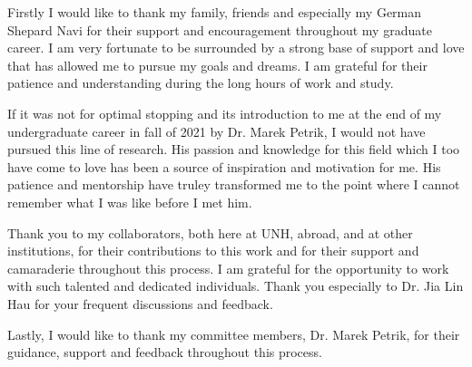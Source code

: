 
Firstly I would like to thank my family, friends and especially my German Shepard Navi for their support and encouragement throughout my graduate career. I am very fortunate to be surrounded by a strong base of support and love that has allowed me to pursue my goals and dreams. I am grateful for their patience and understanding during the long hours of work and study.

If it was not for optimal stopping and its introduction to me at the end of my undergraduate career in fall of 2021 by Dr. Marek Petrik, I would not have pursued this line of research. His passion and knowledge for this field which I too have come to love has been a source of inspiration and motivation for me. His patience and mentorship have truley transformed me to the point where I cannot remember what I was like before I met him.

Thank you to my collaborators, both here at UNH, abroad, and at other institutions, for their contributions to this work and for their support and camaraderie throughout this process. I am grateful for the opportunity to work with such talented and dedicated individuals. Thank you especially to Dr. Jia Lin Hau for your frequent discussions and feedback.

Lastly, I would like to thank my committee members, Dr. Marek Petrik,  for their guidance, support and feedback throughout this process.

